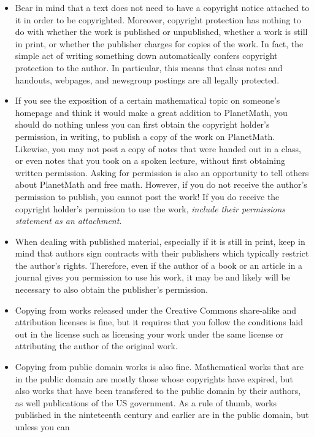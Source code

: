 \begin{itemize}
\item Bear in mind that a text does not need to have a copyright
notice attached to it in order to be copyrighted. Moreover,
copyright protection has nothing to do with whether the work is
published or unpublished, whether a work is still in print, or
whether the publisher charges for copies of the work. In fact, the
simple act of writing something down automatically confers copyright
protection to the author. In particular, this means that class
notes and handouts, webpages, and newsgroup postings are all legally
protected.
\item If you see the exposition of a certain mathematical topic on
someone's homepage and think it would make a great addition to
PlanetMath, you should do nothing unless you can first obtain the
copyright holder's permission, in writing, to publish a copy of the
work on PlanetMath. Likewise, you may not post a copy of notes that
were handed out in a class, or even notes that you took on a spoken
lecture, without first obtaining written permission. Asking for
permission is also an opportunity to tell others about PlanetMath
and free math. However, if you do not receive the author's permission
to publish, you cannot post the work! If you do
receive the copyright holder's permission to use the work,
\emph{include their permissions statement as an attachment.}
\item When dealing with published material, especially if it is still in
print, keep in mind that authors sign contracts with their publishers
which typically restrict the author's rights. Therefore, even if the
author of a book or an article in a journal gives you permission to
use his work, it may be and likely will be necessary to also obtain the
publisher's permission.
\item Copying from works released under the Creative Commons 
share-alike and attribution licenses is fine, but it requires that you
follow the conditions laid out in the license such as licensing your
work under the same license or attributing the author of the
original work. 
\item Copying from public domain works is also fine. Mathematical
works that are in the public domain are mostly those whose
copyrights have expired, but also works that have been transfered to
the public domain by their authors, as well publications of the US
government. As a rule of thumb, works published in the ninteteenth
century and earlier are in the public domain, but unless you can

\end{itemize}
